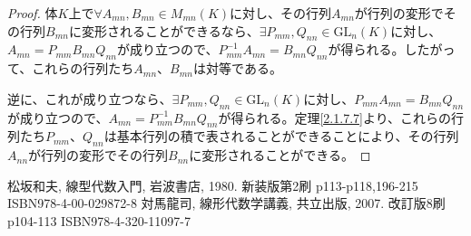 \documentclass[dvipdfmx]{jsarticle}
\begin{document}
\begin{proof}
体$K$上で$\forall A_{mn},B_{mn} \in M_{mn}(K)$に対し、その行列$A_{mn}$が行列の変形でその行列$B_{mn}$に変形されることができるなら、$\exists P_{mm},Q_{nn} \in {\mathrm{GL}}_{n}(K)$に対し、$A_{mn} = P_{mm}B_{mn}Q_{nn}$が成り立つので、$P_{mm}^{- 1}A_{mn} = B_{mn}Q_{nn}$が得られる。したがって、これらの行列たち$A_{mn}$、$B_{mn}$は対等である。\par
逆に、これが成り立つなら、$\exists P_{mm},Q_{nn} \in {\mathrm{GL}}_{n}(K)$に対し、$P_{mm}A_{mn} = B_{mn}Q_{nn}$が成り立つので、$A_{mn} = P_{mm}^{- 1}B_{mn}Q_{nn}$が得られる。定理\ref{2.1.7.7}より、これらの行列たち$P_{mm}$、$Q_{nn}$は基本行列の積で表されることができることにより、その行列$A_{nn}$が行列の変形でその行列$B_{nn}$に変形されることができる。
\end{proof}
\begin{thebibliography}{50}
    松坂和夫, 線型代数入門, 岩波書店, 1980. 新装版第2刷 p113-p118,196-215 ISBN978-4-00-029872-8
    対馬龍司, 線形代数学講義, 共立出版, 2007. 改訂版8刷 p104-113 ISBN978-4-320-11097-7
\end{thebibliography}
\end{document}
